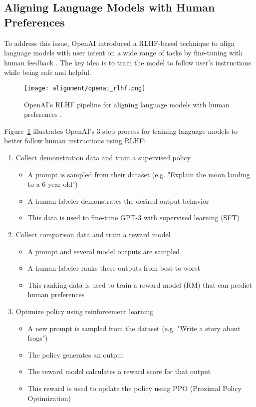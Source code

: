 \subsection{Aligning Language Models with Human Preferences}

To address this issue, OpenAI introduced a RLHF-based technique to align language models with user intent on a wide range of tasks by fine-tuning with human feedback . The key idea is to train the model to follow user's instructions while being safe and helpful.

\begin{figure}[H]
\centering
\texttt{[image: alignment/openai\_rlhf.png]}
\caption{OpenAI's RLHF pipeline for aligning language models with human preferences \cite{ouyang2022traininglanguagemodelsfollow}.}
\label{fig:openai-rlhf}
\end{figure}

Figure~\ref{fig:openai-rlhf} illustrates OpenAI's 3-step process for training language models to better follow human instructions using RLHF:

\begin{enumerate}
\item Collect demonstration data and train a supervised policy
\begin{itemize}
\item A prompt is sampled from their dataset (e.g. "Explain the moon landing to a 6 year old")
\item A human labeler demonstrates the desired output behavior
\item This data is used to fine-tune GPT-3 with supervised learning (SFT)
\end{itemize}

\item Collect comparison data and train a reward model
\begin{itemize}
\item A prompt and several model outputs are sampled
\item A human labeler ranks these outputs from best to worst
\item This ranking data is used to train a reward model (RM) that can predict human preferences
\end{itemize}

\item Optimize policy using reinforcement learning
\begin{itemize}
\item A new prompt is sampled from the dataset (e.g. "Write a story about frogs")
\item The policy generates an output 
\item The reward model calculates a reward score for that output
\item This reward is used to update the policy using PPO (Proximal Policy Optimization)
\end{itemize}
\end{enumerate}

